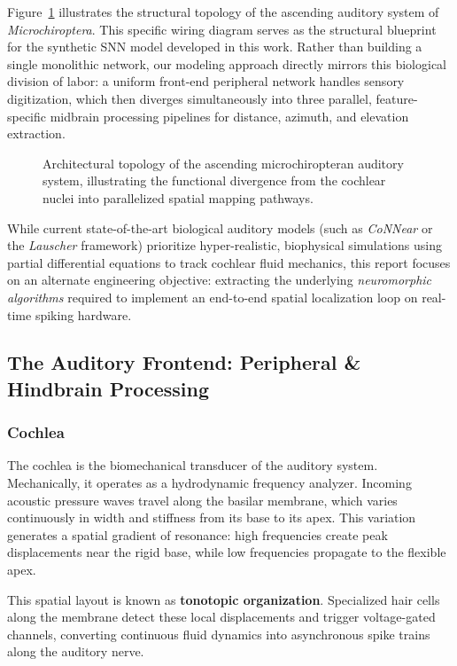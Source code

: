 Figure~\ref{fig:overall_pathway} illustrates the structural topology of the ascending auditory system of \textit{Microchiroptera}. This specific wiring diagram serves as the structural blueprint for the synthetic SNN model developed in this work. Rather than building a single monolithic network, our modeling approach directly mirrors this biological division of labor: a uniform front-end peripheral network handles sensory digitization, which then diverges simultaneously into three parallel, feature-specific midbrain processing pipelines for distance, azimuth, and elevation extraction.

\begin{figure}[htbp]
    \centering
    \caption{Architectural topology of the ascending microchiropteran auditory system, illustrating the functional divergence from the cochlear nuclei into parallelized spatial mapping pathways.}
    \label{fig:overall_pathway}
\end{figure}

While current state-of-the-art biological auditory models (such as \textit{CoNNear} or the \textit{Lauscher} framework) prioritize hyper-realistic, biophysical simulations using partial differential equations to track cochlear fluid mechanics, this report focuses on an alternate engineering objective: extracting the underlying \textit{neuromorphic algorithms} required to implement an end-to-end spatial localization loop on real-time spiking hardware.

\subsection{The Auditory Frontend: Peripheral \& Hindbrain Processing}

\subsubsection{Cochlea}
The cochlea is the biomechanical transducer of the auditory system. Mechanically, it operates as a hydrodynamic frequency analyzer. Incoming acoustic pressure waves travel along the basilar membrane, which varies continuously in width and stiffness from its base to its apex. This variation generates a spatial gradient of resonance: high frequencies create peak displacements near the rigid base, while low frequencies propagate to the flexible apex. 

This spatial layout is known as \textbf{tonotopic organization}. Specialized hair cells along the membrane detect these local displacements and trigger voltage-gated channels, converting continuous fluid dynamics into asynchronous spike trains along the auditory nerve.

